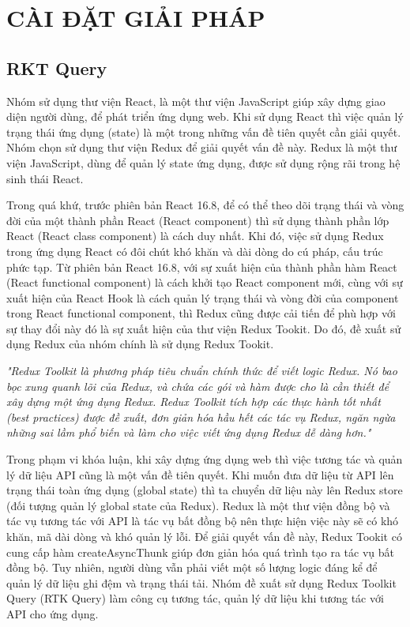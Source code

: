 \chapter{CÀI ĐẶT GIẢI PHÁP}

\section{RKT Query}

\tab Nhóm sử dụng thư viện React, là một thư viện JavaScript giúp xây dựng giao diện người dùng, để phát triển ứng dụng web.
Khi sử dụng React thì việc quản lý trạng thái ứng dụng (state) là một trong những vấn đề tiên quyết cần giải quyết.
Nhóm chọn sử dụng thư viện Redux để giải quyết vấn đề này.
Redux là một thư viện JavaScript, dùng để quản lý state ứng dụng, được sử dụng rộng rãi trong hệ sinh thái React.
\par

Trong quá khứ, trước phiên bản React 16.8, để có thể theo dõi trạng thái và vòng đời của một thành phần React (React component) thì sử dụng thành phần lớp React (React class component) là cách duy nhất.
Khi đó, việc sử dụng Redux trong ứng dụng React có đôi chút khó khăn và dài dòng do cú pháp, cấu trúc phức tạp.
Từ phiên bản React 16.8, với sự xuất hiện của thành phần hàm React (React functional component) là cách khởi tạo React component mới, cùng với sự xuất hiện của React Hook là cách quản lý trạng thái và vòng đời của component trong React functional component, thì Redux cũng được cải tiến để phù hợp với sự thay đổi này đó là sự xuất hiện của thư viện Redux Tookit.
Do đó, đề xuất sử dụng Redux của nhóm chính là sử dụng Redux Tookit.
\par

\textit{"Redux Toolkit là phương pháp tiêu chuẩn chính thức để viết logic Redux.
  Nó bao bọc xung quanh lõi của Redux, và chứa các gói và hàm được cho là cần thiết để xây dựng một ứng dụng Redux.
  Redux Toolkit tích hợp các thực hành tốt nhất (best practices) được đề xuất, đơn giản hóa hầu hết các tác vụ Redux, ngăn ngừa những sai lầm phổ biến và làm cho việc viết ứng dụng Redux dễ dàng hơn."} \cite{chap4bib1}
\par

Trong phạm vi khóa luận, khi xây dựng ứng dụng web thì việc tương tác và quản lý dữ liệu API cũng là một vấn đề tiên quyết.
Khi muốn đưa dữ liệu từ API lên trạng thái toàn ứng dụng (global state) thì ta chuyển dữ liệu này lên Redux store (đối tượng quản lý global state của Redux).
Redux là một thư viện đồng bộ và tác vụ tương tác với API là tác vụ bất đồng bộ nên thực hiện việc này sẽ có khó khăn, mã dài dòng và khó quản lý lỗi.
Để giải quyết vấn đề này, Redux Tookit có cung cấp hàm createAsyncThunk giúp đơn giản hóa quá trình tạo ra tác vụ bất đồng bộ.
Tuy nhiên, người dùng vẫn phải viết một số lượng logic đáng kể để quản lý dữ liệu ghi đệm và trạng thái tải.
Nhóm đề xuất sử dụng Redux Toolkit Query (RTK Query) làm công cụ tương tác, quản lý dữ liệu khi tương tác với API cho ứng dụng.
\par


